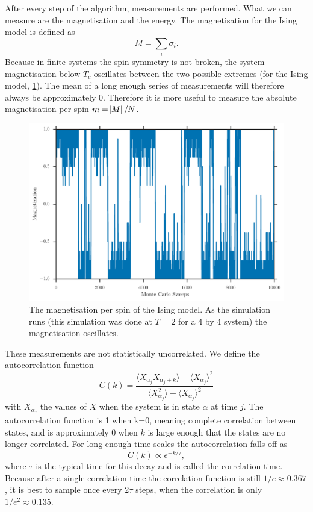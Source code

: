 \documentclass[11pt, a4paper]{report} %
\begin{document}
After every step of the algorithm, measurements are performed.
What we can measure are the magnetisation and the energy.
The magnetisation for the Ising model is defined as
\begin{equation}
	M = \sum_i \sigma_i.
\end{equation}
Because in finite systems the spin symmetry is not broken, the system magnetisation below \(T_c\) oscillates between the two possible extremes (for the Ising model, \cref{fig:ising_4by4_magnetization_history}).
The mean of a long enough series of measurements will therefore always be approximately 0.
Therefore it is more useful to measure the absolute magnetisation per spin \(m = \abs{M} / N\).
\begin{figure}
	\includegraphics[width=\textwidth]{ising_4by4_magnetization_history.pdf}
	\caption{The magnetisation per spin of the Ising model. As the simulation runs (this simulation was done at \(T=2\) for a 4 by 4 system) the magnetisation oscillates.}
	\label{fig:ising_4by4_magnetization_history}
\end{figure}

These measurements are not statistically uncorrelated.
We define the autocorrelation function\cite{binney:1992}
\begin{equation}
	C(k) = \frac{\langle X_{\alpha_j} X_{\alpha_j+k} \rangle - \langle X_{\alpha_j} \rangle^2}{\langle X_{\alpha_j}^2 \rangle - \langle X_{\alpha_j} \rangle^2}
\end{equation}
with \(X_{\alpha_j}\) the values of \(X\) when the system is in state \(\alpha\) at time \(j\).
The autocorrelation function is 1 when k=0, meaning complete correlation between states, and is approximately 0 when \(k\) is large enough that the states are no longer correlated.
For long enough time scales the autocorrelation falls off as
\begin{equation}
	C(k) \propto e^{-k/\tau},
\end{equation}
where \(\tau\) is the typical time for this decay and is called the correlation time.
Because after a single correlation time the correlation function is still \(1/e\approx0.367\), it is best to sample once every 2\(\tau\) steps, when the correlation is only \(1/e^2\approx 0.135\).\cite{newman:1999}
\end{document}
